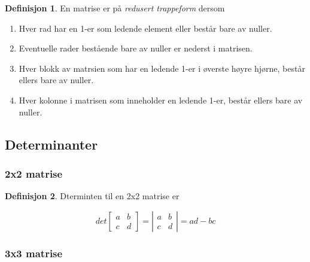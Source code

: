 \documentclass[11pt]{article}
\theoremstyle{definition}
\newtheorem{mindef}{Definisjon}[section]
\newenvironment{fmindef}
{\begin{mdframed}[style=minstil]\begin{mindef}}
		{\end{mindef}\end{mdframed}}
\theoremstyle{definition}
\theoremstyle{definition}
\theoremstyle{definition}
\theoremstyle{definition}
\theoremstyle{definition}
\begin{document}
		\begin{fmindef}
			En matrise er på \textit{redusert trappeform} dersom
			
			\begin{enumerate}
				\item Hver rad har en 1-er som ledende element eller består bare av nuller.
				\item Eventuelle rader bestående bare av nuller er nederst i matrisen.
				\item Hver blokk av matrsien som har en ledende 1-er i øverste høyre hjørne, består ellers bare av nuller.
				\item Hver kolonne i matrisen som inneholder en ledende 1-er, består ellers bare av nuller.
			\end{enumerate}
		\end{fmindef}
		
		\newpage
		
		\subsection{Determinanter}
		
		\subsubsection{2x2 matrise}
		
		\begin{fmindef}
			Dterminten til en 2x2 matrise er
			
			\[det \left[ 	\begin{array}{rr} 
			a & b   \\
			c & d
			\end{array} \right]
			= \left| \begin{array}{rr} 
			a & b \\
			c & d
			\end{array} \right|=ad-bc \]
		\end{fmindef}
		
		\subsubsection{3x3 matrise}
		
\end{document}
